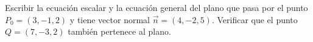 Escribir la ecuación escalar y la ecuación general del plano que pasa por el punto $P_0 = (3, -1, 2)$ y tiene vector normal $\vec{n} = (4, -2, 5)$. Verificar que el punto $Q = (7, -3, 2)$ también pertenece al plano.